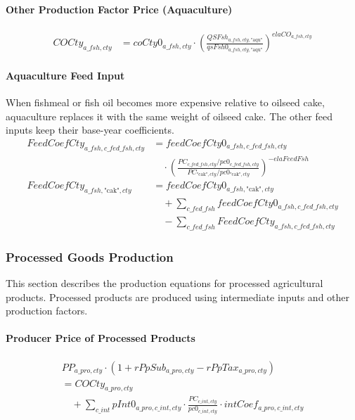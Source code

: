 \paragraph{Other Production Factor Price (Aquaculture)}
\begin{align}
  COCty_{a\_fsh,cty}
  &= coCty0_{a\_fsh,cty}
     \cdot\left(\frac{QSFsh_{a\_fsh,cty,\text{"aqu"}}}{qsFsh0_{a\_fsh,cty,\text{"aqu"}}}\right)^{elaCO_{a\_fsh,cty}}
  \tag{COFshEq}\label{eq:COFshEq}
\end{align}

\paragraph{Aquaculture Feed Input}
When fishmeal or fish oil becomes more expensive relative to oilseed cake, aquaculture replaces it with the same weight of oilseed cake. The other feed inputs keep their base-year coefficients.
\begin{align}
  FeedCoefCty_{a\_fsh,c\_fed\_fsh,cty}
  &= feedCoefCty0_{a\_fsh,c\_fed\_fsh,cty}
     \nonumber\\[-0.3em]
  &\quad \cdot \left(\frac{PC_{c\_fed\_fsh,cty}/pc0_{c\_fed\_fsh,cty}}
                {PC_{\text{"cak"},cty}/pc0_{\text{"cak"},cty}}\right)^{-elaFeedFsh}
  \tag{FeedCoefFshEq}\label{eq:FeedCoefFshEq}\\[0.4em]
  FeedCoefCty_{a\_fsh,\text{"cak"},cty}
  &= feedCoefCty0_{a\_fsh,\text{"cak"},cty}
     \nonumber\\[-0.3em]
  &\quad + \sum_{c\_fed\_fsh} feedCoefCty0_{a\_fsh,c\_fed\_fsh,cty}
     \nonumber\\[-0.3em]
  &\quad - \sum_{c\_fed\_fsh} FeedCoefCty_{a\_fsh,c\_fed\_fsh,cty}
  \tag{FeedCoefCakEq}\label{eq:FeedCoefCakEq}
\end{align}

\subsubsection{Processed Goods Production}

This section describes the production equations for processed agricultural products.  
Processed products are produced using intermediate inputs and other production factors.

\paragraph{Producer Price of Processed Products}
\begin{multline}
  PP_{a\_pro,cty}\cdot(1+rPpSub_{a\_pro,cty}-rPpTax_{a\_pro,cty}) \\
  = COCty_{a\_pro,cty}
     \\[-0.3em]
  \quad + \sum_{c\_int}pInt0_{a\_pro,c\_int,cty}
       \cdot\frac{PC_{c\_int,cty}}{pc0_{c\_int,cty}}\cdot
       intCoef_{a\_pro,c\_int,cty}
  \tag{ProZeroProfitEq}\label{eq:ProZeroProfitEq}
\end{multline}

